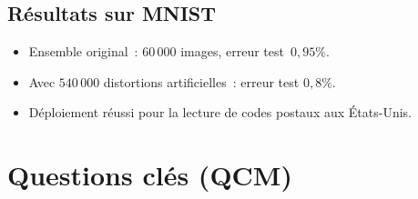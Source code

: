 \documentclass[a4paper,11pt]{article}
\theoremstyle{definition}
\theoremstyle{remark}
\begin{document}
\subsection{R\'esultats sur MNIST}

\begin{itemize}
  \item Ensemble original~: $60\,000$ images, erreur test~$0{,}95\%$.
  \item Avec $540\,000$ distortions artificielles~: erreur test
    $0{,}8\%$.
  \item D\'eploiement r\'eussi pour la lecture de codes postaux
    aux \'Etats-Unis.
\end{itemize}

\newpage
\section*{Questions cl\'es (QCM)}
\end{document}
